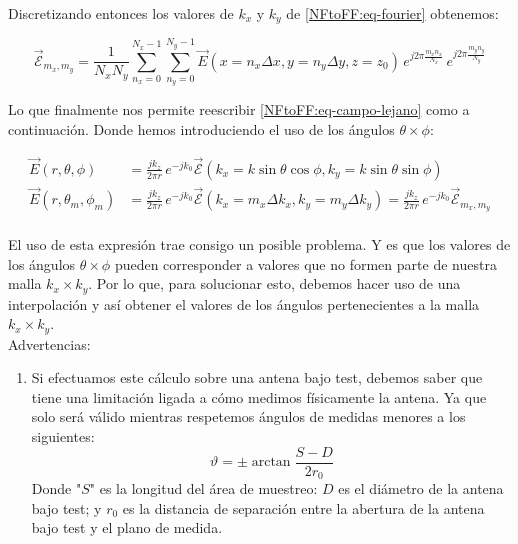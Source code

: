 \documentclass{article}
\begin{document}
\newpage

Discretizando entonces los valores de $k_{x}$ y $k_{y}$ de \eqref{NFtoFF:eq-fourier} obtenemos: 

\begin{equation}
{\vec{\mathcal{E}}}_{m_{x},m_{y}}=\frac{1}{N_{x} N_{y}}
\sum_{n_{x}=0}^{N_{x}-1}\sum_{n_{y}=0}^{N_{y}-1}
\vec{E}(x=n_{x}\Delta x,y=n_{y} \Delta y,z=z_{0}) \,e^{j 2\pi
\frac{m_{x} n_{x}}{N_{x}}}\,e^{j 2\pi \frac{m_{y} n_{y}}{N_{y}}}
\label{eq-fft1}
\end{equation}

Lo que finalmente nos permite reescribir \eqref{NFtoFF:eq-campo-lejano} como a continuación. Donde hemos introduciendo el uso de los ángulos $\theta \times \phi$:

\begin{align}
\vec{E}(r,\theta,\phi)&=\frac{jk_{z}}{2\pi r}\,e^{-jk_{0}}{{\vec{\mathcal{E}}}}(k_{x}=k \sin\theta \cos\phi,k_{y}= k\sin\theta \sin\phi)\nonumber
\\
\vec{E}(r,\theta_{m},\phi_{m})&=\frac{jk_{z}}{2\pi r}\,e^{-jk_{0}}{{\vec{\mathcal{E}}}}(k_{x}=m_{x}\Delta k_{x},k_{y}= m_{y}\Delta k_{y})=\frac{jk_{z}}{2\pi r}\,e^{-jk_{0}}{{\vec{\mathcal{E}}}}_{m_{x},m_{y}}\nonumber
\\
\label{eq-fourier3}
\end{align}

El uso de esta expresión trae consigo un posible problema. Y es que los valores de los ángulos $\theta \times \phi$ pueden corresponder a valores que no formen parte de nuestra malla $k_{x}\times k_{y}$. Por lo que, para solucionar esto, debemos hacer uso de una interpolación y así obtener el valores de los ángulos pertenecientes a la malla $k_{x}\times k_{y}$.
\\

Advertencias:
\begin{enumerate}
\item Si efectuamos este cálculo sobre una antena bajo test, debemos saber que tiene una limitación ligada a cómo medimos físicamente la antena. Ya que solo será válido mientras respetemos ángulos de medidas menores a los siguientes:
\begin{equation}
\vartheta = \pm\arctan \frac{S-D}{2r_{0}}
\end{equation}
Donde "$S$" es la longitud del área de muestreo: $D$  es el diámetro de la antena bajo test; y $r_ {0}$ es la distancia de separación entre la abertura de la antena bajo test y el plano de medida.
\end{enumerate}
\end{document}
